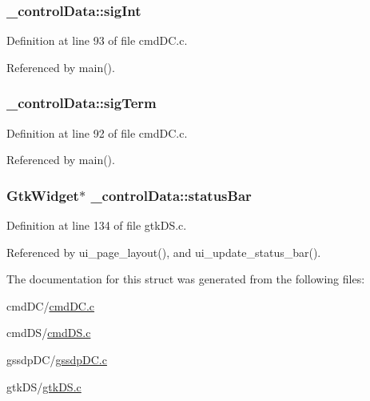 \subsubsection[{sig\+Int}]{ \+\_\+control\+Data\+::sig\+Int}\label{struct__control_data_ae8ad5b5af46f4ab4bcd6ffb41e83385b}


Definition at line 93 of file cmd\+D\+C.\+c.



Referenced by main().

\hypertarget{struct__control_data_af45dc1f0c4806eaac0a57da17db50fdb}{}
\subsubsection[{sig\+Term}]{ \+\_\+control\+Data\+::sig\+Term}\label{struct__control_data_af45dc1f0c4806eaac0a57da17db50fdb}


Definition at line 92 of file cmd\+D\+C.\+c.



Referenced by main().

\hypertarget{struct__control_data_a661ed960369e640e5f56da1abe7c2168}{}
\subsubsection[{status\+Bar}]{\setlength{\rightskip}{0pt plus 5cm}Gtk\+Widget$\ast$ \+\_\+control\+Data\+::status\+Bar}\label{struct__control_data_a661ed960369e640e5f56da1abe7c2168}


Definition at line 134 of file gtk\+D\+S.\+c.



Referenced by ui\+\_\+page\+\_\+layout(), and ui\+\_\+update\+\_\+status\+\_\+bar().



The documentation for this struct was generated from the following files\+:\begin{DoxyCompactItemize}
\item 
cmd\+D\+C/\hyperlink{cmd_d_c_8c}{cmd\+D\+C.\+c}\item 
cmd\+D\+S/\hyperlink{cmd_d_s_8c}{cmd\+D\+S.\+c}\item 
gssdp\+D\+C/\hyperlink{gssdp_d_c_8c}{gssdp\+D\+C.\+c}\item 
gtk\+D\+S/\hyperlink{gtk_d_s_8c}{gtk\+D\+S.\+c}\end{DoxyCompactItemize}
